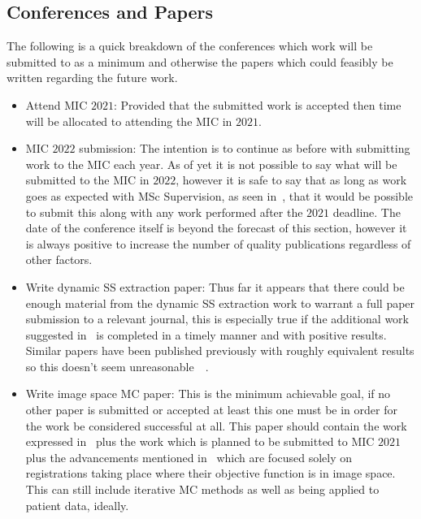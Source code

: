         \subsection{Conferences and Papers} \label{sec:future_work_conferences_and_papers}
            The following is a quick breakdown of the conferences which work will be submitted to as a minimum and otherwise the papers which could feasibly be written regarding the future work.
            
            \begin{itemize}
                \item Attend \gls{MIC} $2021$: Provided that the submitted work is accepted then time will be allocated to attending the \gls{MIC} in $2021$.
    
                \item \gls{MIC} $2022$ submission: The intention is to continue as before with submitting work to the \gls{MIC} each year. As of yet it is not possible to say what will be submitted to the \gls{MIC} in $2022$, however it is safe to say that as long as work goes as expected with \gls{MSc} Supervision, as seen in~, that it would be possible to submit this along with any work performed after the $2021$ deadline. The date of the conference itself is beyond the forecast of this section, however it is always positive to increase the number of quality publications regardless of other factors.
                
                \item Write dynamic \gls{SS} extraction paper: Thus far it appears that there could be enough material from the dynamic \gls{SS} extraction work to warrant a full paper submission to a relevant journal, this is especially true if the additional work suggested in~ is completed in a timely manner and with positive results. Similar papers have been published previously with roughly equivalent results so this doesn't seem unreasonable~~.
                
                \item Write image space \gls{MC} paper: This is the minimum achievable goal, if no other paper is submitted or accepted at least this one must be in order for the work be considered successful at all. This paper should contain the work expressed in~ plus the work which is planned to be submitted to \gls{MIC} $2021$ plus the advancements mentioned in~ which are focused solely on registrations taking place where their objective function is in image space. This can still include iterative \gls{MC} methods as well as being applied to patient data, ideally.
                

\end{itemize}
